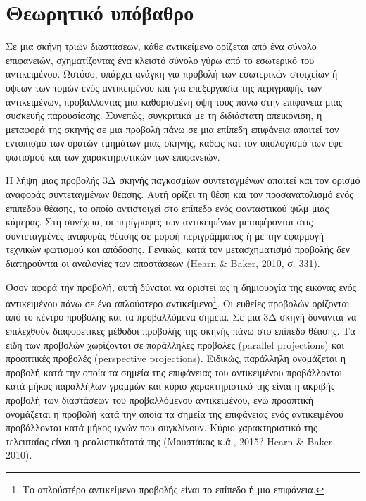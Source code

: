\chapter{Θεωρητικό υπόβαθρο}

Σε μια σκήνη τριών διαστάσεων, κάθε αντικείμενο ορίζεται από ένα σύνολο επιφανειών, σχηματίζοντας ένα κλειστό σύνολο γύρω από το εσωτερικό του αντικειμένου. Ωστόσο, υπάρχει ανάγκη για προβολή των εσωτερικών στοιχείων ή όψεων των τομών ενός αντικειμένου και για επεξεργασία της περιγραφής των αντικειμένων, προβάλλοντας μια καθορισμένη όψη τους πάνω στην επιφάνεια μιας συσκευής παρουσίασης. Συνεπώς, συγκριτικά με τη διδιάστατη απεικόνιση, η μεταφορά της σκηνής σε μια προβολή πάνω σε μια επίπεδη επιφάνεια απαιτεί τον εντοπισμό των ορατών τμημάτων μιας σκηνής, καθώς και τον υπολογισμό των εφέ φωτισμού και των χαρακτηριστικών των επιφανειών. \par

Η λήψη μιας προβολής 3Δ σκηνής παγκοσμίων συντεταγμένων απαιτεί και τον ορισμό αναφοράς συντεταγμένων θέασης. Αυτή ορίζει τη θέση και τον προσανατολισμό ενός επιπέδου θέασης, το οποίο αντιστοιχεί στο επίπεδο ενός φανταστικού φιλμ μιας κάμερας. Στη συνέχεια, οι περίγραφες των αντικειμένων μεταφέρονται στις συντεταγμένες αναφοράς θέασης σε μορφή περιγράμματος ή με την εφαρμογή τεχνικών φωτισμού και απόδοσης. Γενικώς, κατά τον μετασχηματισμό προβολής δεν διατηρούνται οι αναλογίες των αποστάσεων (\textlatin{Hearn \& Baker}, 2010, σ. 331). \par

Όσον αφορά την προβολή, αυτή δύναται να οριστεί ως η δημιουργία της εικόνας ενός αντικειμένου πάνω σε ένα απλούστερο αντικείμενο\footnote{Το απλούστέρο αντικείμενο προβολής είναι το επίπεδο ή μια επιφάνεια.}. Οι ευθείες προβολών ορίζονται από το κέντρο προβολής και τα προβαλλόμενα σημεία. Σε μια 3Δ σκηνή δύνανται να επιλεχθούν διαφορετικές μέθοδοι προβολής της σκηνής πάνω στο επίπεδο θέασης. Τα είδη των προβολών χωρίζονται σε παράλληλες προβολές (\textlatin{parallel projections}) και προοπτικές προβολές (\textlatin{perspective projections}). Ειδικώς, παράλληλη ονομάζεται η προβολή κατά την οποία τα σημεία της επιφάνειας του αντικειμένου προβάλλονται κατά μήκος παραλλήλων γραμμών και κύριο χαρακτηριστικό της είναι η ακριβής προβολή των διαστάσεων του προβαλλόμενου αντικειμένου, ενώ προοπτική ονομάζεται η προβολή κατά την οποία τα σημεία της επιφάνειας ενός αντικειμένου προβάλλονται κατά μήκος ιχνών που συγκλίνουν. Κύριο χαρακτηριστικό της τελευταίας είναι η ρεαλιστικότατά της (Μουστάκας κ.ά., 2015? \textlatin{Hearn \& Baker}, 2010). \par

